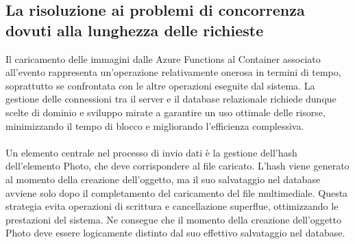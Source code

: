 \subsection{La risoluzione ai problemi di concorrenza dovuti alla lunghezza delle richieste}

Il caricamento delle immagini dalle Azure Functions al Container associato all’evento rappresenta un'operazione relativamente onerosa in termini di tempo, 
soprattutto se confrontata con le altre operazioni eseguite dal sistema. 
La gestione delle connessioni tra il server e il database relazionale richiede dunque scelte di dominio e sviluppo mirate a garantire un uso ottimale delle risorse, 
minimizzando il tempo di blocco e migliorando l'efficienza complessiva.\\
\\
Un elemento centrale nel processo di invio dati è la gestione dell’hash dell’elemento Photo, che deve corrispondere al file caricato. 
L’hash viene generato al momento della creazione dell’oggetto, ma il suo salvataggio nel database avviene solo dopo il completamento del caricamento del file multimediale. 
Questa strategia evita operazioni di scrittura e cancellazione superflue, ottimizzando le prestazioni del sistema. 
Ne consegue che il momento della creazione dell’oggetto Photo deve essere logicamente distinto dal suo effettivo salvataggio nel database.

